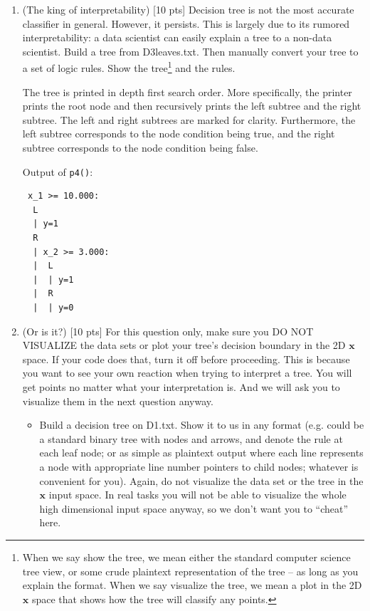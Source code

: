 \documentclass[a4paper]{article}
\theoremstyle{definition}
\def\x{\mathbf x}
\newenvironment{soln}{
    \leavevmode\color{blue}\ignorespaces
}{}
\begin{document}
\begin{enumerate}
\item (The king of interpretability)  [10 pts] Decision tree is not the most accurate classifier in general.  However, it persists.  This is largely due to its rumored interpretability: a data scientist can easily explain a tree to a non-data scientist.  Build a tree from D3leaves.txt.  Then manually convert your tree to a set of logic rules.  Show the tree\footnote{When we say show the tree, we mean either the standard computer science tree view, or some crude plaintext representation of the tree -- as long as you explain the format.  When we say visualize the tree, we mean a plot in the 2D $\x$ space that shows how the tree will classify any points.} and the rules. \\

        \begin{soln}
          The tree is printed in depth first search order. More specifically, the printer prints the root node and then recursively prints the left subtree and the right subtree. The left and right subtrees are marked for clarity. Furthermore, the left subtree corresponds to the node condition being true, and the right subtree corresponds to the node condition being false.

          Output of \verb|p4()|:
\begin{verbatim}
 x_1 >= 10.000:
  L
  | y=1
  R
  | x_2 >= 3.000:
  |  L
  |  | y=1
  |  R
  |  | y=0
\end{verbatim}
        \end{soln}

\item (Or is it?)  [10 pts] For this question only, make sure you DO NOT VISUALIZE the data sets or plot your tree's decision boundary in the 2D $\x$ space.  If your code does that, turn it off before proceeding.  This is because you want to see your own reaction when trying to interpret a tree.  You will get points no matter what your interpretation is.
And we will ask you to visualize them in the next question anyway.
  \begin{itemize}

    \item Build a decision tree on D1.txt.  Show it to us in any format (e.g. could be a standard binary tree with nodes and arrows, and denote the rule at each leaf node; or as simple as plaintext output where each line represents a node with appropriate line number pointers to child nodes; whatever is convenient for you). Again, do not visualize the data set or the tree in the $\x$ input space.  In real tasks you will not be able to visualize the whole high dimensional input space anyway, so we don't want you to ``cheat'' here.


\end{itemize}
\end{enumerate}
\end{document}
